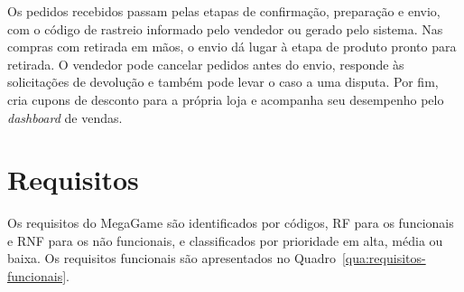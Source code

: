 \documentclass[
  12pt,
  a4paper,
  oneside,
  chapter=TITLE,
  subsection=TITLE,
  sumario=abnt-6027-2012,
  english,
  brazil
]{abntex2}
\begin{document}
Os pedidos recebidos passam pelas etapas de confirmação, preparação e
envio, com o código de rastreio informado pelo vendedor ou gerado pelo
sistema. Nas compras com retirada em mãos, o envio dá lugar à etapa de
produto pronto para retirada. O vendedor pode cancelar pedidos antes do
envio, responde às solicitações de devolução e também pode levar o caso
a uma disputa. Por fim, cria cupons de desconto para a própria loja e
acompanha seu desempenho pelo \emph{dashboard} de vendas.

\section{Requisitos}

Os requisitos do MegaGame são identificados por códigos, RF para os
funcionais e RNF para os não funcionais, e classificados por prioridade
em alta, média ou baixa. Os requisitos funcionais são apresentados no
Quadro~\ref{qua:requisitos-funcionais}.
\end{document}
